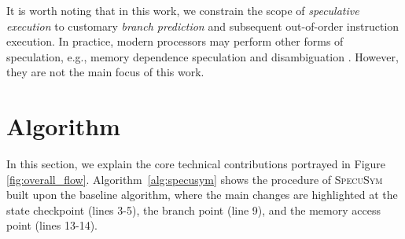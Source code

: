 \documentclass[sigconf,screen]{acmart}
\begin{document}
It is worth noting that in this work, we constrain the scope of \textit{speculative
execution} to customary \textit{branch prediction} and subsequent out-of-order 
instruction execution. In practice, modern processors may perform other forms of 
speculation, e.g., memory dependence speculation and disambiguation
\cite{Nicolau89,MoshovosS97,ReinmanC98,OnderG99}. However, they are not the main 
focus of this work. 




\section{Algorithm}
\label{sec:specuSE}

In this section, we explain the core technical contributions portrayed in Figure
\ref{fig:overall_flow}. Algorithm~\ref{alg:specusym} shows the procedure of 
\textsc{SpecuSym} built upon the baseline algorithm, where the main changes are 
highlighted at the state checkpoint (lines 3-5), the branch point (line 9), and 
the memory access point (lines 13-14). 
\end{document}
